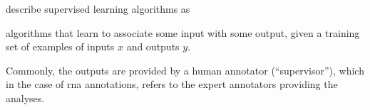 


\textcite{goodfellow2016deep} describe supervised learning
algorithms as

\begin{italicquotes}
    algorithms that learn to associate some input with some
    output, given a training set of examples of inputs $x$
    and outputs $y$.
\end{italicquotes}

Commonly, the outputs are provided by a human annotator
(``supervisor''), which in the case of \gls{rna}
annotations, refers to the expert annotators providing the
analyses.
